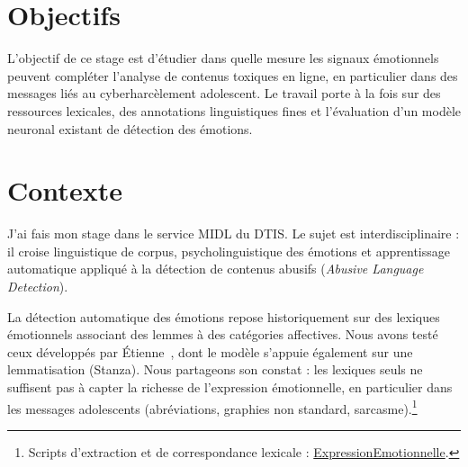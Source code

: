 









\maketitle


\section*{Objectifs}

L'objectif de ce stage est d'étudier dans quelle mesure les signaux émotionnels peuvent compléter l'analyse de contenus toxiques en ligne, en particulier dans des messages liés au cyberharcèlement adolescent. Le travail porte à la fois sur des ressources lexicales, des annotations linguistiques fines et l'évaluation d'un modèle neuronal existant de détection des émotions.

\section*{Contexte}

J'ai fais mon stage dans le service MIDL du DTIS. Le sujet est interdisciplinaire : il croise linguistique de corpus, psycholinguistique des émotions et apprentissage automatique appliqué à la détection de contenus abusifs (\textit{Abusive Language Detection}).

La détection automatique des émotions repose historiquement sur des lexiques émotionnels associant des lemmes à des catégories affectives. Nous avons testé ceux développés par Étienne~\citep{etienne2023analyse}, dont le modèle s'appuie également sur une lemmatisation (Stanza). Nous partageons son constat : les lexiques seuls ne suffisent pas à capter la richesse de l'expression émotionnelle, en particulier dans les messages adolescents (abréviations, graphies non standard, sarcasme).\footnote{Scripts d'extraction et de correspondance lexicale : \href{https://github.com/GwenTsang/ExpressionEmotionnelle}{ExpressionEmotionnelle}.}

